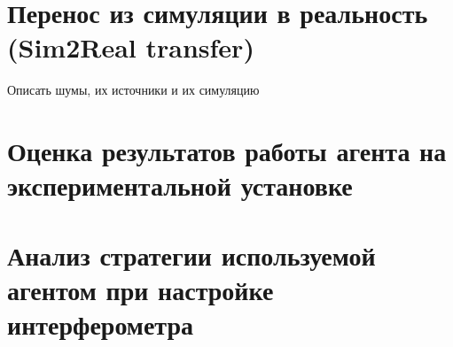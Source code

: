 \section{Перенос из симуляции в реальность (Sim2Real transfer)}

Описать шумы, их источники и их симуляцию


\section{Оценка результатов работы агента на экспериментальной установке}

\section{Анализ стратегии используемой агентом при настройке интерферометра}

